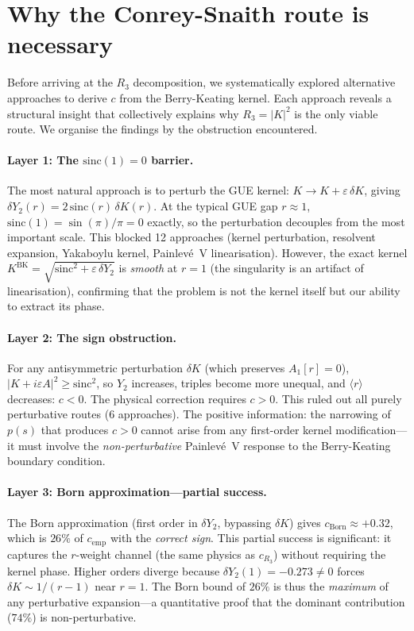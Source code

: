 \documentclass[11pt]{article}
\begin{document}
\section{Why the Conrey-Snaith route is necessary}
\label{sec:obstructions}

Before arriving at the $R_3$ decomposition, we systematically explored
alternative approaches to derive $c$ from the Berry-Keating kernel.
Each approach reveals a structural insight that collectively explains
why $R_3 = |K|^2$ is the only viable route. We organise the findings
by the obstruction encountered.

\paragraph{Layer 1: The $\mathrm{sinc}(1) = 0$ barrier.}
The most natural approach is to perturb the GUE kernel:
$K \to K + \varepsilon\,\delta K$, giving
$\delta Y_2(r) = 2\,\mathrm{sinc}(r)\,\delta K(r)$. At the typical GUE gap
$r \approx 1$, $\mathrm{sinc}(1) = \sin(\pi)/\pi = 0$ exactly, so the
perturbation decouples from the most important scale. This blocked
12 approaches (kernel perturbation, resolvent expansion, Yakaboylu kernel,
Painlev\'e~V linearisation). However, the exact kernel
$K^{\mathrm{BK}} = \sqrt{\mathrm{sinc}^2 + \varepsilon\,\delta Y_2}$ is
\emph{smooth} at $r = 1$ (the singularity is an artifact of linearisation),
confirming that the problem is not the kernel itself but our ability to
extract its phase.

\paragraph{Layer 2: The sign obstruction.}
For any antisymmetric perturbation $\delta K$ (which preserves $A_1[r] = 0$),
$|K + i\varepsilon A|^2 \geq \mathrm{sinc}^2$, so $Y_2$ increases,
triples become more unequal, and $\langle r\rangle$ decreases: $c < 0$.
The physical correction requires $c > 0$. This ruled out all purely
perturbative routes (6 approaches). The positive information: the narrowing
of $p(s)$ that produces $c > 0$ cannot arise from any first-order kernel
modification---it must involve the \emph{non-perturbative} Painlev\'e~V
response to the Berry-Keating boundary condition.

\paragraph{Layer 3: Born approximation---partial success.}
The Born approximation (first order in $\delta Y_2$, bypassing $\delta K$)
gives $c_{\mathrm{Born}} \approx +0.32$, which is $26\%$ of $c_{\mathrm{emp}}$
with the \emph{correct sign}. This partial success is significant: it captures
the $r$-weight channel (the same physics as $c_{R_3}$) without requiring the
kernel phase. Higher orders diverge because $\delta Y_2(1) = -0.273 \neq 0$
forces $\delta K \sim 1/(r-1)$ near $r = 1$. The Born bound of $26\%$
is thus the \emph{maximum} of any perturbative expansion---a quantitative
proof that the dominant contribution ($74\%$) is non-perturbative.
\end{document}
